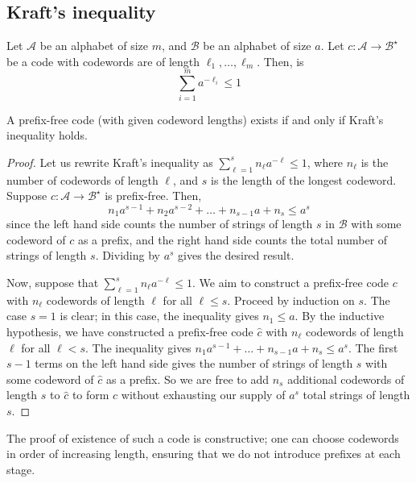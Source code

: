 \subsection{Kraft's inequality}
\begin{definition}
    Let $\mathcal A$ be an alphabet of size $m$, and $\mathcal B$ be an alphabet of size $a$.
    Let $c \colon \mathcal A \to \mathcal B^\star$ be a code with codewords are of length $\ell_1, \dots, \ell_m$.
    Then,  is
    \[ \sum_{i=1}^m a^{-\ell_i} \leq 1 \]
\end{definition}
\begin{theorem}
    A prefix-free code (with given codeword lengths) exists if and only if Kraft's inequality holds.
\end{theorem}
\begin{proof}
    Let us rewrite Kraft's inequality as $\sum_{\ell=1}^s n_\ell a^{-\ell} \leq 1$, where $n_\ell$ is the number of codewords of length $\ell$, and $s$ is the length of the longest codeword.
    Suppose $c \colon \mathcal A \to \mathcal B^\star$ is prefix-free.
    Then,
    \[ n_1 a^{s-1} + n_2 a^{s-2} + \dots + n_{s-1} a + n_s \leq a^s \]
    since the left hand side counts the number of strings of length $s$ in $\mathcal B$ with some codeword of $c$ as a prefix, and the right hand side counts the total number of strings of length $s$.
    Dividing by $a^s$ gives the desired result.

    Now, suppose that $\sum_{\ell=1}^s n_\ell a^{-\ell} \leq 1$.
    We aim to construct a prefix-free code $c$ with $n_\ell$ codewords of length $\ell$ for all $\ell \leq s$.
    Proceed by induction on $s$.
    The case $s = 1$ is clear; in this case, the inequality gives $n_1 \leq a$.
    By the inductive hypothesis, we have constructed a prefix-free code $\hat c$ with $n_\ell$ codewords of length $\ell$ for all $\ell < s$.
    The inequality gives $n_1 a^{s-1} + \dots + n_{s-1} a + n_s \leq a^s$.
    The first $s - 1$ terms on the left hand side gives the number of strings of length $s$ with some codeword of $\hat c$ as a prefix.
    So we are free to add $n_s$ additional codewords of length $s$ to $\hat c$ to form $c$ without exhausting our supply of $a^s$ total strings of length $s$.
\end{proof}
\begin{remark}
    The proof of existence of such a code is constructive; one can choose codewords in order of increasing length, ensuring that we do not introduce prefixes at each stage.
\end{remark}

